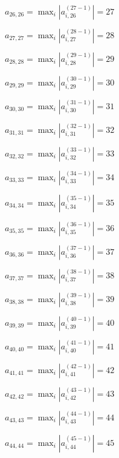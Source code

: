\documentclass[a4paper,12pt]{article}
\begin{document}
$a _{ 26, 26 } =  \max _i |a _{ i, 26 } ^{ (27 - 1) } | = 27$

$a _{ 27, 27 } =  \max _i |a _{ i, 27 } ^{ (28 - 1) } | = 28$

$a _{ 28, 28 } =  \max _i |a _{ i, 28 } ^{ (29 - 1) } | = 29$

$a _{ 29, 29 } =  \max _i |a _{ i, 29 } ^{ (30 - 1) } | = 30$

$a _{ 30, 30 } =  \max _i |a _{ i, 30 } ^{ (31 - 1) } | = 31$

$a _{ 31, 31 } =  \max _i |a _{ i, 31 } ^{ (32 - 1) } | = 32$

$a _{ 32, 32 } =  \max _i |a _{ i, 32 } ^{ (33 - 1) } | = 33$

$a _{ 33, 33 } =  \max _i |a _{ i, 33 } ^{ (34 - 1) } | = 34$

$a _{ 34, 34 } =  \max _i |a _{ i, 34 } ^{ (35 - 1) } | = 35$

$a _{ 35, 35 } =  \max _i |a _{ i, 35 } ^{ (36 - 1) } | = 36$

$a _{ 36, 36 } =  \max _i |a _{ i, 36 } ^{ (37 - 1) } | = 37$

$a _{ 37, 37 } =  \max _i |a _{ i, 37 } ^{ (38 - 1) } | = 38$

$a _{ 38, 38 } =  \max _i |a _{ i, 38 } ^{ (39 - 1) } | = 39$

$a _{ 39, 39 } =  \max _i |a _{ i, 39 } ^{ (40 - 1) } | = 40$

$a _{ 40, 40 } =  \max _i |a _{ i, 40 } ^{ (41 - 1) } | = 41$

$a _{ 41, 41 } =  \max _i |a _{ i, 41 } ^{ (42 - 1) } | = 42$

$a _{ 42, 42 } =  \max _i |a _{ i, 42 } ^{ (43 - 1) } | = 43$

$a _{ 43, 43 } =  \max _i |a _{ i, 43 } ^{ (44 - 1) } | = 44$

$a _{ 44, 44 } =  \max _i |a _{ i, 44 } ^{ (45 - 1) } | = 45$
\end{document}
